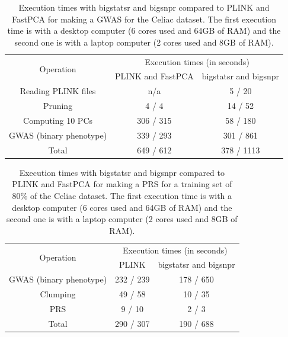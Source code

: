 \documentclass{bioinfo}
\begin{document}
\begin{table}[!tpb]
\begin{center}
\begin{adjustbox}{max width=235pt}
\begin{tabular}{|c|c|c|}
\hline
\multirow{2}{*}{Operation} &   \multicolumn{2}{c|}{Execution times (in seconds)} \\
 \cline{2-3}
 & PLINK and FastPCA & bigstatsr and bigsnpr \\
\hline
Reading PLINK files & n/a & 5 / 20 \\
Pruning & 4 / 4 & 14 / 52 \\
Computing 10 PCs & 306 / 315 & 58 / 180 \\
GWAS (binary phenotype) & 339 / 293 & 301 / 861 \\
\hline
Total & 649 / 612 & 378 / 1113 \\
\hline
\end{tabular} 
\end{adjustbox}
\end{center}
\caption{Execution times with bigstatsr and bigsnpr compared to PLINK and FastPCA for making a GWAS for the Celiac dataset. The first execution time is with a desktop computer (6 cores used and 64GB of RAM) and the second one is with a laptop computer (2 cores used and 8GB of RAM).} 
\label{tab:bench-gwas}
\end{table}

\begin{table}[!tpb]
\begin{center}
\begin{adjustbox}{max width=235pt}
\begin{tabular}{|c|c|c|}
\hline
\multirow{2}{*}{Operation} &   \multicolumn{2}{c|}{Execution times (in seconds)} \\
 \cline{2-3}
 & PLINK & bigstatsr and bigsnpr \\
\hline
GWAS (binary phenotype) & 232 / 239 & 178 / 650  \\
Clumping & 49 / 58 & 10 / 35 \\
PRS & 9 / 10 & 2 / 3 \\
\hline
Total & 290 / 307 & 190 / 688 \\
\hline
\end{tabular} 
\end{adjustbox}
\end{center}
\caption{Execution times with bigstatsr and bigsnpr compared to PLINK and FastPCA for making a PRS for a training set of 80\% of the Celiac dataset. The first execution time is with a desktop computer (6 cores used and 64GB of RAM) and the second one is with a laptop computer (2 cores used and 8GB of RAM).}
\label{tab:bench-prs}
\end{table}
\end{document}

